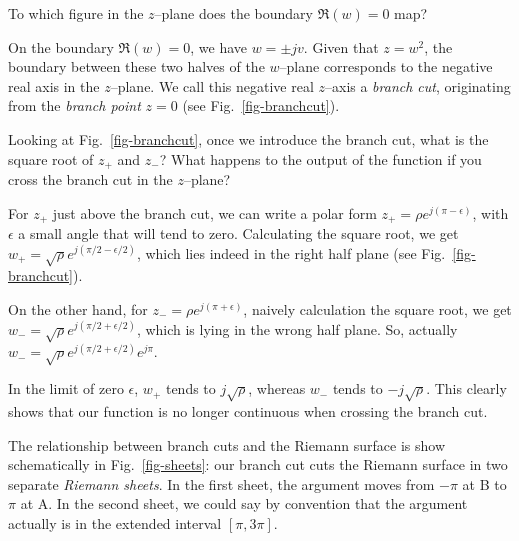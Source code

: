 \begin{cue}
To which figure in the $z$--plane does the boundary $\Re(w)=0$ map?
\end{cue}

On the boundary $\Re(w)=0$, we have $w=\pm jv$. Given that $z=w^2$, the boundary between these two halves of the $w$--plane corresponds to the negative real axis in the $z$--plane. We call this negative real $z$--axis a \emph{branch cut}, originating from the \emph{branch point} $z=0$ (see Fig.~\ref{fig-branchcut}).

\begin{cue}
Looking at Fig.~\ref{fig-branchcut}, once we introduce the branch cut, what is the square root of $z_+$ and $z_-$? What happens to the output of the function if you cross the branch cut in the $z$--plane? 
\end{cue}

For $z_+$ just above the branch cut, we can write a polar form $z_+ = \rho e^{j (\pi - \epsilon)}$, with $\epsilon$ a small angle that will tend to zero. Calculating the square root, we get $w_+ = \sqrt{\rho} e^{j (\pi/2 - \epsilon/2)}$, which lies indeed in the right half plane (see Fig.~\ref{fig-branchcut}).

On the other hand, for $z_- = \rho e^{j (\pi + \epsilon)}$, naively calculation the square root, we get $w_- = \sqrt{\rho} e^{j (\pi/2 + \epsilon/2)}$, which is lying in the wrong half plane. So, actually $w_- = \sqrt{\rho} e^{j (\pi/2 + \epsilon/2)} e^{j \pi}$.  

In the limit of zero $\epsilon$, $w_+$ tends to $j\sqrt{\rho}$, whereas $w_-$ tends to $-j\sqrt{\rho}$. This clearly shows that our function is no longer continuous when crossing the branch cut.

The relationship between branch cuts and the Riemann surface is show schematically in Fig.~\ref{fig-sheets}: our branch cut cuts the Riemann surface in two separate \emph{Riemann sheets}. In the first sheet, the argument moves from $-\pi$ at B to $\pi$ at A. In the second sheet, we could say by convention that the argument actually is in the extended interval $[\pi, 3\pi]$.

